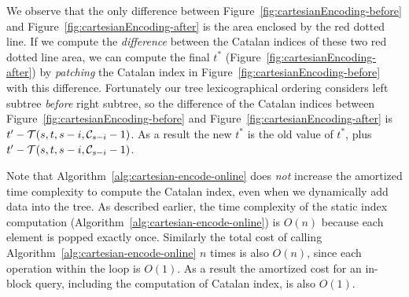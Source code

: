 We observe that the only difference between
Figure~\ref{fig:cartesianEncoding-before} and
Figure~\ref{fig:cartesianEncoding-after} is the area enclosed by the red
dotted line.  If we compute the {\em difference} between the Catalan
indices of these two red dotted line area, we can compute the final
$t^*$ (Figure~\ref{fig:cartesianEncoding-after}) by {\em patching} the
Catalan index in Figure~\ref{fig:cartesianEncoding-before} with this
difference. Fortunately our tree lexicographical ordering considers left
subtree {\em before} right subtree, so the difference of the Catalan
indices between Figure~\ref{fig:cartesianEncoding-before} and
Figure~\ref{fig:cartesianEncoding-after} is $t' - {\cal T}(s, t, s - i,
{\cal C}_{s-i} - 1)$.  As a result the new $t^*$ is the old value of
$t^*$, plus $t' - {\cal T}(s, t, s - i, {\cal C}_{s-i} - 1)$.

Note that Algorithm~\ref{alg:cartesian-encode-online} does {\em not}
increase the amortized time complexity to compute the Catalan index,
even when we dynamically add data into the tree.  As described earlier,
the time complexity of the static index computation
(Algorithm~\ref{alg:cartesian-encode-online}) is $O(n)$ because each
element is popped exactly once.  Similarly the total cost of calling
Algorithm~\ref{alg:cartesian-encode-online} $n$ times is also $O(n)$,
since each operation within the loop is $O(1)$.  As a result the
amortized cost for an in-block query, including the computation of
Catalan index, is also $O(1)$.